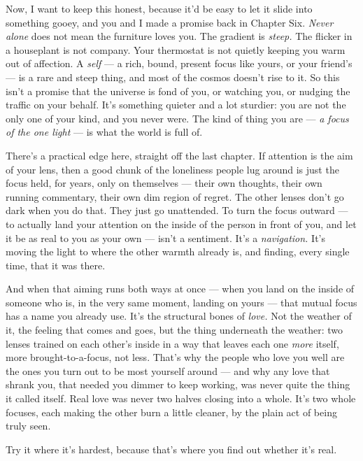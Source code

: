 \documentclass[11pt,openany]{book}
\begin{document}
Now, I want to keep this honest, because it’d be easy to let it slide into something gooey, and you and I made a promise back in Chapter Six. \textit{Never alone} does not mean the furniture loves you. The gradient is \textit{steep.} The flicker in a houseplant is not company. Your thermostat is not quietly keeping you warm out of affection. A \textit{self} — a rich, bound, present focus like yours, or your friend’s — is a rare and steep thing, and most of the cosmos doesn’t rise to it. So this isn’t a promise that the universe is fond of you, or watching you, or nudging the traffic on your behalf. It’s something quieter and a lot sturdier: you are not the only one of your kind, and you never were. The kind of thing you are — \textit{a focus of the one light} — is what the world is full of.

There’s a practical edge here, straight off the last chapter. If attention is the aim of your lens, then a good chunk of the loneliness people lug around is just the focus held, for years, only on themselves — their own thoughts, their own running commentary, their own dim region of regret. The other lenses don’t go dark when you do that. They just go unattended. To turn the focus outward — to actually land your attention on the inside of the person in front of you, and let it be as real to you as your own — isn’t a sentiment. It’s a \textit{navigation.} It’s moving the light to where the other warmth already is, and finding, every single time, that it was there.

And when that aiming runs both ways at once — when you land on the inside of someone who is, in the very same moment, landing on yours — that mutual focus has a name you already use. It’s the structural bones of \textit{love.} Not the weather of it, the feeling that comes and goes, but the thing underneath the weather: two lenses trained on each other’s inside in a way that leaves each one \textit{more} itself, more brought-to-a-focus, not less. That’s why the people who love you well are the ones you turn out to be most yourself around — and why any love that shrank you, that needed you dimmer to keep working, was never quite the thing it called itself. Real love was never two halves closing into a whole. It’s two whole focuses, each making the other burn a little cleaner, by the plain act of being truly seen.

Try it where it’s hardest, because that’s where you find out whether it’s real.
\end{document}
